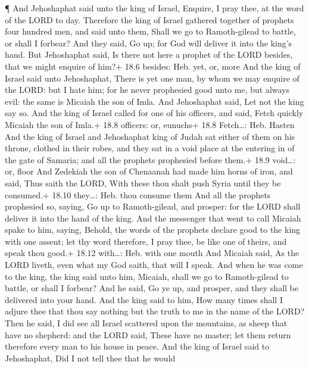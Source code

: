 ¶ And Jehoshaphat said unto the king of Israel, Enquire, I
pray thee, at the word of the LORD to day.  Therefore the
king of Israel gathered together of prophets four hundred men, and said
unto them, Shall we go to Ramoth-gilead to battle, or shall I forbear?
And they said, Go up; for God will deliver it into the king's hand.
 But Jehoshaphat said, Is there not here a prophet of the
LORD besides, that we might enquire of him?+ 18.6 besides: Heb. yet, or,
more  And the king of Israel said unto Jehoshaphat, There is
yet one man, by whom we may enquire of the LORD: but I hate him; for he
never prophesied good unto me, but always evil: the same is Micaiah the
son of Imla. And Jehoshaphat said, Let not the king say so. 
And the king of Israel called for one of his officers, and said, Fetch
quickly Micaiah the son of Imla.+ 18.8 officers: or, eunuchs+ 18.8
Fetch\ldots: Heb. Hasten  And the king of Israel and
Jehoshaphat king of Judah sat either of them on his throne, clothed in
their robes, and they sat in a void place at the entering in of the gate
of Samaria; and all the prophets prophesied before them.+ 18.9
void\ldots: or, floor  And Zedekiah the son of Chenaanah
had made him horns of iron, and said, Thus saith the LORD, With these
thou shalt push Syria until they be consumed.+ 18.10 they\ldots: Heb.
thou consume them  And all the prophets prophesied so,
saying, Go up to Ramoth-gilead, and prosper: for the LORD shall deliver
it into the hand of the king.  And the messenger that went
to call Micaiah spake to him, saying, Behold, the words of the prophets
declare good to the king with one assent; let thy word therefore, I pray
thee, be like one of theirs, and speak thou good.+ 18.12 with\ldots:
Heb. with one mouth  And Micaiah said, As the LORD liveth,
even what my God saith, that will I speak.  And when he was
come to the king, the king said unto him, Micaiah, shall we go to
Ramoth-gilead to battle, or shall I forbear? And he said, Go ye up, and
prosper, and they shall be delivered into your hand.  And
the king said to him, How many times shall I adjure thee that thou say
nothing but the truth to me in the name of the LORD?  Then
he said, I did see all Israel scattered upon the mountains, as sheep
that have no shepherd: and the LORD said, These have no master; let them
return therefore every man to his house in peace.  And the
king of Israel said to Jehoshaphat, Did I not tell thee that he would
